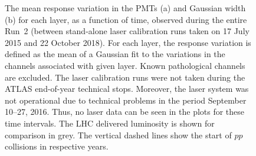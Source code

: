 \begin{figure}[htbp]
\centering
    \caption{The mean response variation in the PMTs (a) and Gaussian width (b) for each layer, as a function of time, observed during the entire Run~2 (between stand-alone laser calibration runs taken on 17 July 2015 and 22 October 2018). For each layer, the response variation is defined as the mean of a Gaussian fit to the variations in the channels associated with given layer. Known pathological channels are excluded. The laser calibration runs were not taken during the ATLAS end-of-year technical stops. Moreover, the laser system was not operational due to technical problems in the period September 10--27, 2016. Thus, no laser data can be seen in the plots for these time intervals. The LHC delivered luminosity is shown for comparison in grey. The vertical dashed lines show the start of $pp$ collisions in respective years.
    }\label{fig:LaserDrift_run2}
\end{figure}

\FloatBarrier
